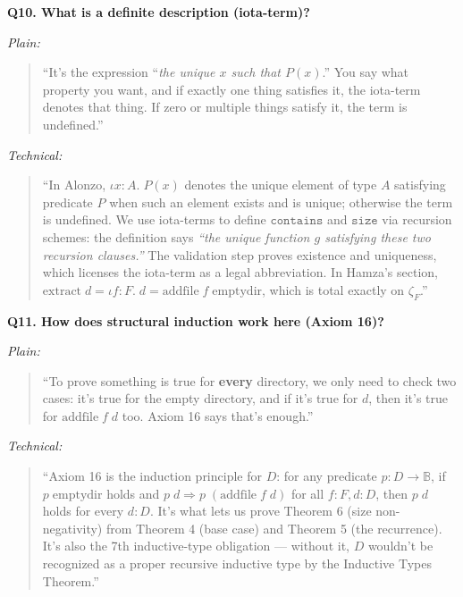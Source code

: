 \documentclass[12pt]{article}
\newenvironment{say}{%
  \par\medskip%
  \begin{quote}%
  \setlength{\parskip}{0.7em}%
  \large\itshape%
}{%
  \end{quote}%
  \medskip%
}
\begin{document}
\vspace{0.8em}
\textbf{\color{slidebar}Q10. What is a definite description (iota-term)?}

\textit{\color{pauseclr}Plain:}
\begin{say}
``It's the expression ``\textit{the unique $x$ such that $P(x)$}.'' You say what property you want, and if exactly one thing satisfies it, the iota-term denotes that thing. If zero or multiple things satisfy it, the term is undefined.''
\end{say}

\textit{\color{pauseclr}Technical:}
\begin{say}
``In Alonzo, $\iota x : A.\; P(x)$ denotes the unique element of type $A$ satisfying predicate $P$ when such an element exists and is unique; otherwise the term is undefined. We use iota-terms to define $\mathtt{contains}$ and $\mathtt{size}$ via recursion schemes: the definition says \emph{``the unique function $g$ satisfying these two recursion clauses.''} The validation step proves existence and uniqueness, which licenses the iota-term as a legal abbreviation. In Hamza's section, $\mathrm{extract}\;d = \iota f : F.\; d = \mathrm{addfile}\;f\;\mathrm{emptydir}$, which is total exactly on $\zeta_F$.''
\end{say}

\vspace{0.8em}
\textbf{\color{slidebar}Q11. How does structural induction work here (Axiom 16)?}

\textit{\color{pauseclr}Plain:}
\begin{say}
``To prove something is true for \textbf{every} directory, we only need to check two cases: it's true for the empty directory, and if it's true for $d$, then it's true for $\mathrm{addfile}\;f\;d$ too. Axiom 16 says that's enough.''
\end{say}

\textit{\color{pauseclr}Technical:}
\begin{say}
``Axiom 16 is the induction principle for $D$: for any predicate $p : D \to \mathbb{B}$, if $p\;\mathrm{emptydir}$ holds and $p\;d \Rightarrow p\;(\mathrm{addfile}\;f\;d)$ for all $f:F, d:D$, then $p\;d$ holds for every $d:D$. It's what lets us prove Theorem 6 (size non-negativity) from Theorem 4 (base case) and Theorem 5 (the recurrence). It's also the 7th inductive-type obligation --- without it, $D$ wouldn't be recognized as a proper recursive inductive type by the Inductive Types Theorem.''
\end{say}
\end{document}
